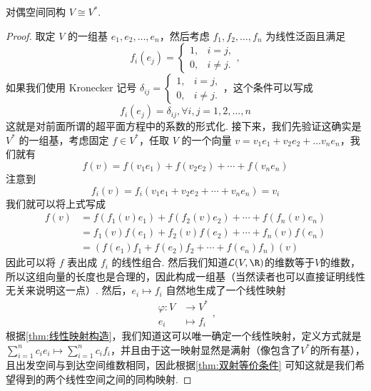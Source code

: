 \begin{theorem}{}{对偶空间同构}
    $V \cong V^*$.
\end{theorem}

\begin{proof}
    取定 $V$ 的一组基 $e_1, e_2, \ldots, e_n$，然后考虑 $f_1, f_2, \ldots, f_n$ 为线性泛函且满足
    \[f_i(e_j) = \begin{cases}
            1, & i = j,    \\
            0, & i \neq j.
        \end{cases},\]
    如果我们使用 Kronecker 记号 $\delta_{ij}=\begin{cases}
            1, & i = j,    \\
            0, & i \neq j.
        \end{cases}$，这个条件可以写成
    \[f_i(e_j) = \delta_{ij}, \forall i, j = 1, 2, \ldots, n\]
    这就是对前面所谓的超平面方程中的系数的形式化. 接下来，我们先验证这确实是 $V^*$ 的一组基，考虑固定 $f \in V^*$，任取 $V$ 的一个向量 $v = v_1 e_1 + v_2 e_2 + \ldots v_n e_n$，我们就有
    \[f(v) = f(v_1 e_1) + f(v_2 e_2) + \cdots + f(v_n e_n)\]
    注意到
    \[f_i(v) = f_i (v_1 e_1 + v_2 e_2 + \cdots + v_n e_n) = v_i\]
    我们就可以将上式写成
    \begin{align*}
        f(v) & = f(f_1(v) e_1) + f(f_2(v) e_2) + \cdots + f(f_n(v) e_n) \\
             & = f_1(v) f(e_1) + f_2(v) f(e_2) + \cdots + f_n(v) f(e_n) \\
             & = (f(e_1) f_1 + f(e_2) f_2 + \cdots + f(e_n) f_n)(v)
    \end{align*}
    因此可以将 $f$ 表出成 $f_i$ 的线性组合. 然后我们知道$\mathcal{L}(V, \R)$的维数等于$V$的维数，所以这组向量的长度也是合理的，因此构成一组基（当然读者也可以直接证明线性无关来说明这一点）. 然后，$e_i \mapsto f_i$ 自然地生成了一个线性映射
    \begin{equation*}
        \begin{aligned}
            \varphi: V & \to V^*     \\
            e_i        & \mapsto f_i
        \end{aligned},
    \end{equation*}
    根据\autoref{thm:线性映射构造}，我们知道这可以唯一确定一个线性映射，定义方式就是$\sum_{i=1}^nc_ie_i \mapsto\sum_{i=1}^nc_if_i$，并且由于这一映射显然是满射（像包含了$V^*$的所有基），且出发空间与到达空间维数相同，因此根据\autoref{thm:双射等价条件} 可知这就是我们希望得到的两个线性空间之间的同构映射.
\end{proof}

